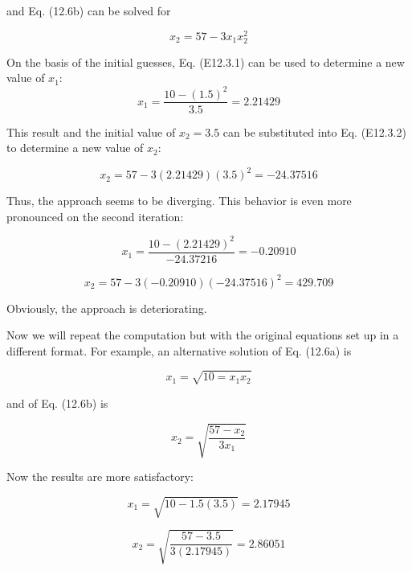 \documentclass[../main.tex]{subfiles}
\begin{document}
and Eq. (12.6b) can be solved for

\begin{equation}
x_{2}=57-3x_{1}x_{2}^{2}
\tag{E12.3.1}
\end{equation}

On the basis of the initial guesses, Eq. (E12.3.1) can be used to determine a new value
of $x_{1}$:
\begin{equation}
x_{1}=\frac{10-(1.5)^{2}}{3.5}=2.21429
\end{equation}

This result and the initial value of $x_{2}=3.5$ can be substituted into Eq. (E12.3.2) to determine a new value of $x_{2}$:

\begin{equation}
x_{2}=57-3(2.21429)(3.5)^{2}=-24.37516
\end{equation}

Thus, the approach seems to be diverging. This behavior is even more pronounced on the
second iteration:

\begin{equation}
x_{1}=\frac{10-(2.21429)^{2}}{-24.37216}=-0.20910
\end{equation}

\begin{equation}
x_{2}=57-3(-0.20910)(-24.37516)^{2}=429.709
\end{equation}


Obviously, the approach is deteriorating.

Now we will repeat the computation but with the original equations set up in a different format. For example, an alternative solution of Eq. (12.6a) is

\begin{equation}
x_{1}=\sqrt{10=x_{1}x_{2}}
\end{equation}

and of Eq. (12.6b) is

\begin{equation}
x_{2}=\sqrt{\frac{57-x_{2}}{3x_{1}}}
\end{equation}

Now the results are more satisfactory:

\begin{equation}
x_{1}=\sqrt{10-1.5(3.5)} = 2.17945
\end{equation}

\begin{equation}
x_{2}=\sqrt{\frac{57-3.5}{3(2.17945)}}=2.86051
\end{equation}
\end{document}
